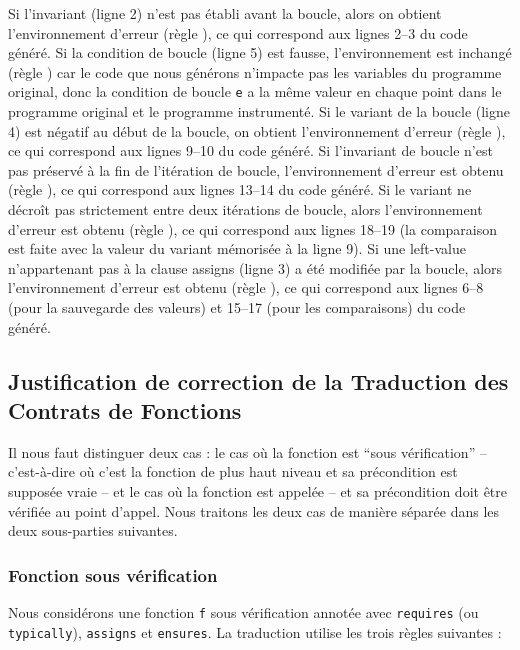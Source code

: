 Si l'invariant (ligne 2) n'est pas établi avant la boucle, alors on obtient
l'environnement d'erreur (règle ), ce qui correspond aux
lignes 2--3 du code généré.
Si la condition de boucle (ligne 5) est fausse, l'environnement est inchangé
(règle ) car le code que nous générons n'impacte pas les
variables du programme original, donc la condition de boucle \lstinline'e' a la
même valeur en chaque point dans le programme original et le programme
instrumenté.
Si le variant de la boucle (ligne 4) est négatif au début de la boucle, on
obtient l'environnement d'erreur (règle ), ce qui correspond
aux lignes 9--10 du code généré.
Si l'invariant de boucle n'est pas préservé à la fin de l'itération de boucle,
l'environnement d'erreur est obtenu (règle ), ce qui
correspond aux lignes 13--14 du code généré.
Si le variant ne décroît pas strictement entre deux itérations de boucle, alors
l'environnement d'erreur est obtenu (règle ), ce qui
correspond aux lignes 18--19 (la comparaison est faite avec la valeur du variant
mémorisée à la ligne 9).
Si une left-value n'appartenant pas à la clause assigns (ligne 3) a été modifiée
par la boucle, alors l'environnement d'erreur est obtenu (règle
), ce qui correspond aux lignes 6--8 (pour la sauvegarde des
valeurs) et 15--17 (pour les comparaisons) du code généré.





\subsection{Justification de correction de la Traduction des Contrats de
  Fonctions}

Il nous faut distinguer deux cas : le
cas où la fonction est ``sous vérification'' -- c'est-à-dire où c'est la
fonction de plus haut niveau et sa précondition est supposée vraie -- et le cas
où la fonction est appelée -- et sa précondition doit être vérifiée au point
d'appel.
Nous traitons les deux cas de manière séparée dans les deux sous-parties
suivantes.


\subsubsection{Fonction sous vérification}





Nous considérons une fonction \lstinline'f' sous vérification annotée avec
\lstinline'requires' (ou \lstinline'typically'), \lstinline'assigns' et
\lstinline'ensures'.
La traduction utilise les trois règles suivantes :

